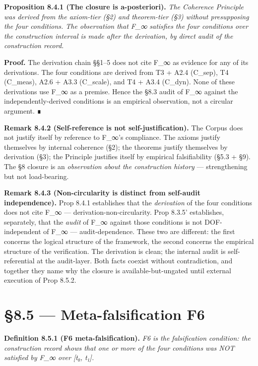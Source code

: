 \documentclass[11pt, openany]{book}
\newcommand{\sectionbreak}{\clearpage}
\begin{document}
\textbf{Proposition 8.4.1 (The closure is a-posteriori).} \textit{The Coherence Principle was derived from the axiom-tier (§2) and theorem-tier (§3) without presupposing the four conditions. The observation that F\_\allowbreak{}∞ satisfies the four conditions over the construction interval is made after the derivation, by direct audit of the construction record.}

\textbf{Proof.} The derivation chain §§1–5 does not cite F\_\allowbreak{}∞ as evidence for any of its derivations. The four conditions are derived from T3 + A2.4 (C\_\allowbreak{}sep), T4 (C\_\allowbreak{}meas), A2.6 + A3.3 (C\_\allowbreak{}scale), and T4 + A3.4 (C\_\allowbreak{}dyn). None of these derivations use F\_\allowbreak{}∞ as a premise. Hence the §8.3 audit of F\_\allowbreak{}∞ against the independently-derived conditions is an empirical observation, not a circular argument. ∎

\textbf{Remark 8.4.2 (Self-reference is not self-justification).} The Corpus does not justify itself by reference to F\_\allowbreak{}∞'s compliance. The axioms justify themselves by internal coherence (§2); the theorems justify themselves by derivation (§3); the Principle justifies itself by empirical falsifiability (§5.3 + §9). The §8 closure is an \textit{observation about the construction history} --- strengthening but not load-bearing.

\textbf{Remark 8.4.3 (Non-circularity is distinct from self-audit independence).} Prop 8.4.1 establishes that the \textit{derivation} of the four conditions does not cite F\_\allowbreak{}∞ --- derivation-non-circularity. Prop 8.3.5' establishes, separately, that the \textit{audit} of F\_\allowbreak{}∞ against those conditions is not DOF-independent of F\_\allowbreak{}∞ --- audit-dependence. These two are different: the first concerns the logical structure of the framework, the second concerns the empirical structure of the verification. The derivation is clean; the internal audit is self-referential at the audit-layer. Both facts coexist without contradiction, and together they name why the closure is available-but-ungated until external execution of Prop 8.5.2.

\sectionbreak

\section{§8.5 --- Meta-falsification F6}

\textbf{Definition 8.5.1 (F6 meta-falsification).} \textit{F6 is the falsification condition: the construction record shows that one or more of the four conditions was NOT satisfied by F\_\allowbreak{}∞ over [t₀, t₁].}
\end{document}
